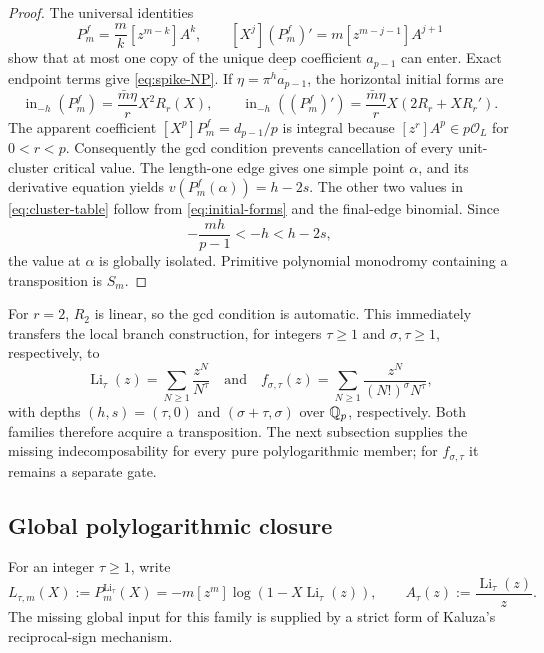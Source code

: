 \begin{proof}
The universal identities
\begin{equation}
[X^k]P_m^f=\frac mk[z^{m-k}]A^k,
\qquad
[X^j](P_m^f)'=m[z^{m-j-1}]A^{j+1}
\label{eq:faber-universal}
\end{equation}
show that at most one copy of the unique deep coefficient $a_{p-1}$ can
enter. Exact endpoint terms give \eqref{eq:spike-NP}. If
$\eta=\overline{\pi^ha_{p-1}}$, the horizontal initial forms are
\begin{equation}
\operatorname{in}_{-h}(P_m^f)
=\frac{\bar m\eta}{r}X^2R_r(X),
\qquad
\operatorname{in}_{-h}((P_m^f)')
=\frac{\bar m\eta}{r}X(2R_r+XR_r').
\label{eq:initial-forms}
\end{equation}
The apparent coefficient $[X^p]P_m^f=d_{p-1}/p$ is integral because
$[z^r]A^p\in p\mathcal O_L$ for $0<r<p$. Consequently the gcd condition
prevents cancellation of every unit-cluster critical value. The length-one
edge gives one simple point $\alpha$, and its derivative equation yields
$v(P_m^f(\alpha))=h-2s$. The other two values in
\eqref{eq:cluster-table} follow from \eqref{eq:initial-forms} and the
final-edge binomial. Since
\[
-\frac{mh}{p-1}<-h<h-2s,
\]
the value at $\alpha$ is globally isolated. Primitive polynomial monodromy
containing a transposition is $S_m$.
\end{proof}

For $r=2$, $R_2$ is linear, so the gcd condition is automatic. This
immediately transfers the local branch construction, for integers
$\tau\ge1$ and $\sigma,\tau\ge1$, respectively, to
\begin{equation}
\operatorname{Li}_\tau(z)=\sum_{N\ge1}\frac{z^N}{N^\tau}
\quad\text{and}\quad
f_{\sigma,\tau}(z)=\sum_{N\ge1}\frac{z^N}{(N!)^\sigma N^\tau},
\label{eq:transfer-families}
\end{equation}
with depths $(h,s)=(\tau,0)$ and $(\sigma+\tau,\sigma)$ over $\mathbb Q_p$,
respectively. Both families therefore acquire a transposition.  The next
subsection supplies the missing indecomposability for every pure
polylogarithmic member; for $f_{\sigma,\tau}$ it remains a separate gate.

\subsection{Global polylogarithmic closure}

For an integer $\tau\ge1$, write
\begin{equation}
L_{\tau,m}(X):=P_m^{\operatorname{Li}_\tau}(X)
=-m[z^m]\log\!\left(1-X\operatorname{Li}_\tau(z)\right),
\qquad
A_\tau(z):=\frac{\operatorname{Li}_\tau(z)}z.
\label{eq:polylog-faber}
\end{equation}
The missing global input for this family is supplied by a strict form of
Kaluza's reciprocal-sign mechanism.


